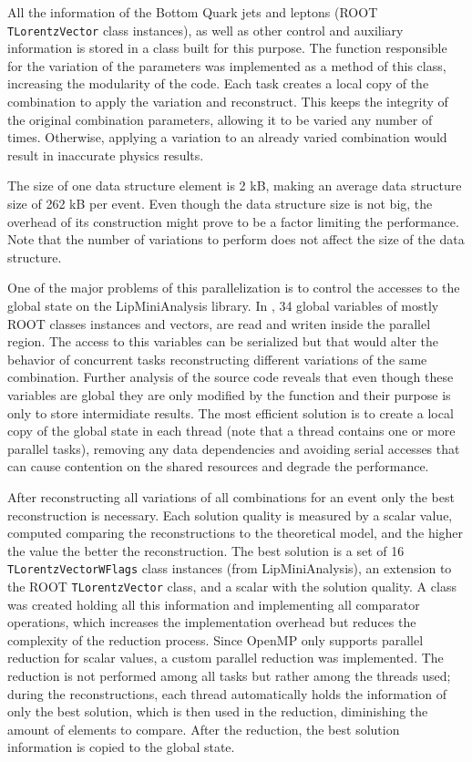 All the information of the Bottom Quark jets and leptons (ROOT \texttt{TLorentzVector} class instances), as well as other control and auxiliary information is stored in a class built for this purpose. The function responsible for the variation of the parameters was implemented as a method of this class, increasing the modularity of the code. Each task creates a local copy of the combination to apply the variation and reconstruct. This keeps the integrity of the original combination parameters, allowing it to be varied any number of times. Otherwise, applying a variation to an already varied combination would result in inaccurate physics results.

The size of one data structure element is 2 kB, making an average data structure size of 262 kB per event. Even though the data structure size is not big, the overhead of its construction might prove to be a factor limiting the performance. Note that the number of variations to perform does not affect the size of the data structure.

One of the major problems of this parallelization is to control the accesses to the global state on the LipMiniAnalysis library. In \ttDilepKinFit, 34 global variables of mostly ROOT classes instances and vectors, are read and writen inside the parallel region. The access to this variables can be serialized but that would alter the behavior of concurrent tasks reconstructing different variations of the same combination. Further analysis of the source code reveals that even though these variables are global they are only modified by the \ttDilepKinFit function and their purpose is only to store intermidiate results. The most efficient solution is to create a local copy of the global state in each thread (note that a thread contains one or more parallel tasks), removing any data dependencies and avoiding serial accesses that can cause contention on the shared resources and degrade the performance.

After reconstructing all variations of all combinations for an event only the best reconstruction is necessary. Each solution quality is measured by a scalar value, computed comparing the reconstructions to the theoretical model, and the higher the value the better the reconstruction. The best solution is a set of 16 \texttt{TLorentzVectorWFlags} class instances (from LipMiniAnalysis), an extension to the ROOT \texttt{TLorentzVector} class, and a scalar with the solution quality. A class was created holding all this information and implementing all comparator operations, which increases the implementation overhead but reduces the complexity of the reduction process. Since OpenMP only supports parallel reduction for scalar values, a custom parallel reduction was implemented. The reduction is not performed among all tasks but rather among the threads used; during the reconstructions, each thread automatically holds the information of only the best solution, which is then used in the reduction, diminishing the amount of elements to compare. After the reduction, the best solution information is copied to the global state.

